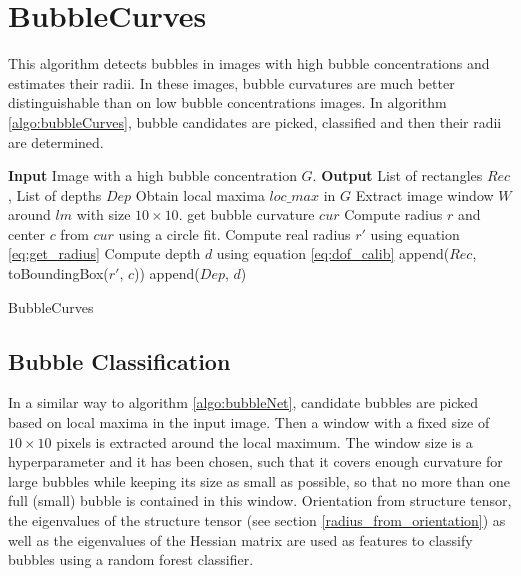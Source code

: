 	
	
	\section{BubbleCurves}\label{BubbleCurves}
		This algorithm detects bubbles in images with high bubble concentrations and estimates their radii. In these images, bubble curvatures are much better distinguishable than on low bubble concentrations images. In algorithm \ref{algo:bubbleCurves}, bubble candidates are picked, classified and then their radii are determined.
	
		\begin{algorithm}
			\begin{algorithmic}[1]
				\State \textbf{Input} Image with a high bubble concentration $G$. 
				\State \textbf{Output} List of rectangles $Rec$, List of depths $Dep$
				\State Obtain local maxima $loc\_max$ in $G$
					\State Extract image window $W$ around $lm$ with size $10 \times 10$.
						\State get bubble curvature $cur$ 
						\State Compute radius $r$ and center $c$ from $cur$ using a circle fit.
						\State Compute real radius $r'$ using equation \ref{eq:get_radius}
						\State Compute depth $d$ using equation \ref{eq:dof_calib}
						\State append($Rec$, toBoundingBox($r'$, $c$))
						\State append($Dep$, $d$)
					\EndIf
				\EndFor
			\end{algorithmic}
			
			\caption{BubbleCurves}
			\label{algo:bubbleCurves}
		\end{algorithm}
	
	
	
	
	
	
	\subsection{Bubble Classification}\label{bubble_classification}
		In a similar way to algorithm \ref{algo:bubbleNet}, candidate bubbles are picked based on local maxima in the input image. Then a window with a fixed size of $10 \times 10$ pixels is extracted around the local maximum. The window size is a hyperparameter and it has been chosen, such that it covers enough curvature for large bubbles while keeping its size as small as possible, so that no more than one full (small) bubble is contained in this window. 
		 Orientation from structure tensor, the eigenvalues of the structure tensor (see section \ref{radius_from_orientation}) as well as the eigenvalues of the Hessian matrix are used as features to classify bubbles using a random forest classifier. 
		
